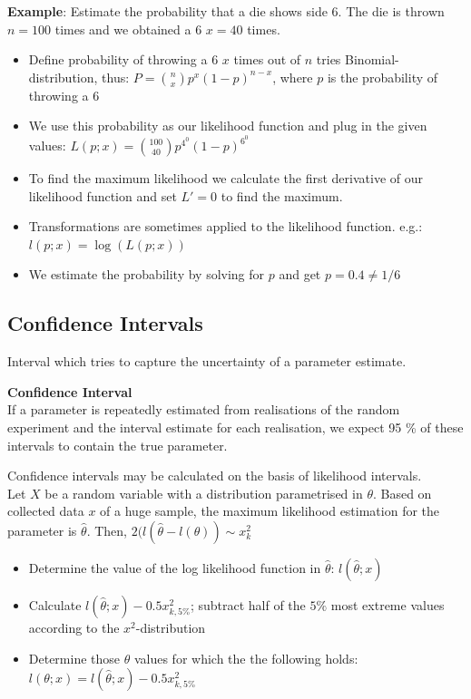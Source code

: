 \documentclass{article}
\begin{document}
\begin{multicols*}{3}
\textbf{Example}: Estimate the probability that a die shows side 6. \textrightarrow The die is thrown $n = 100$ times and we obtained a 6 $x = 40$ times. 
\begin{itemize}
    \item Define probability of throwing a 6 $x$ times out of $n$ tries \textrightarrow Binomial-distribution, thus: $P = {n\choose x}p^x(1-p)^{n-x}$, where $p$ is the probability of throwing a 6
    \item We use this probability as our likelihood function and plug in the given values: $L(p;x) = {100\choose 40}p^4^0(1-p)^6^0$
    \item To find the maximum likelihood we calculate the first derivative of our likelihood function and set $L' = 0$ to find the maximum. 
    \item Transformations are sometimes applied to the likelihood function. e.g.: $l(p;x) = \log (L(p;x))$
    \item We estimate the probability by solving for $p$ and get $p = 0.4 \neq 1/6$
\end{itemize}

\subsection{Confidence Intervals}

Interval which tries to capture the uncertainty of a parameter estimate. 

\begin{mdframed}[backgroundcolor=astral] 
    \textbf{Confidence Interval}\\
    If a parameter is repeatedly estimated from realisations of the random experiment and the interval estimate for each realisation, we expect 95 \% of these intervals to contain the true parameter.
\end{mdframed}

Confidence intervals may be calculated on the basis of likelihood intervals.\\
Let $X$ be a random variable with a distribution parametrised in $\theta$. Based on collected data $x$ of a huge sample, the maximum likelihood estimation for the parameter is $\hat{\theta}$. Then, $2(l(\hat{\theta} - l(\theta)) \sim x^2_k$
\begin{itemize}
    \item Determine the value of the log likelihood function in $\hat{\theta}$: $l(\hat{\theta};x)$
    \item Calculate $l(\hat{\theta};x) - 0.5x^2_{k,5\%}$; subtract half of the $5\%$ most extreme values according to the $x^2$-distribution
    \item Determine those $\theta$ values for which the the following holds: 
    $l(\theta;x) = l(\hat{\theta};x) - 0.5x^2_{k,5\%}$
\end{itemize}


\end{multicols*}
\end{document}
